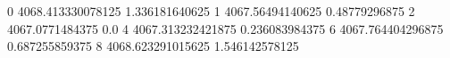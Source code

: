 0 4068.413330078125 1.336181640625
1 4067.56494140625 0.48779296875
2 4067.0771484375 0.0
4 4067.313232421875 0.236083984375
6 4067.764404296875 0.687255859375
8 4068.623291015625 1.546142578125
